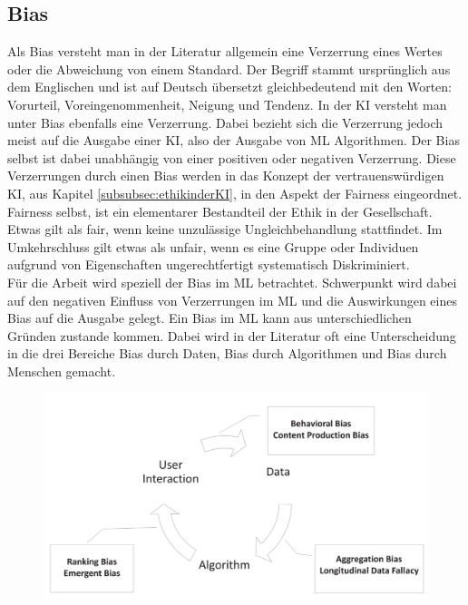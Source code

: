 \begin{onehalfspace}
    \subsection{Bias}
    \label{subsubsec:Bias}
        Als Bias versteht man in der Literatur allgemein eine Verzerrung eines Wertes oder die Abweichung von einem Standard.\cite{Fabi2022} Der Begriff stammt ursprünglich aus dem Englischen und ist auf Deutsch übersetzt gleichbedeutend mit den Worten: Vorurteil, Voreingenommenheit, Neigung und Tendenz. In der \ac*{KI} versteht man unter Bias ebenfalls eine Verzerrung. Dabei bezieht sich die Verzerrung jedoch meist auf die Ausgabe einer \ac*{KI}, also der Ausgabe von \ac*{ML} Algorithmen.\cite{Dilmegani2020} Der Bias selbst ist dabei unabhängig von einer positiven oder negativen Verzerrung.\cite{silberg2019notes}\cite{ntoutsi2020bias}
        Diese Verzerrungen durch einen Bias werden in das Konzept der vertrauenswürdigen \ac*{KI}, aus Kapitel \ref{subsubsec:ethikinderKI}, in den Aspekt der Fairness eingeordnet. Fairness selbst, ist ein elementarer Bestandteil der Ethik in der Gesellschaft. Etwas gilt als \glqq{}fair\grqq{}, wenn keine unzulässige Ungleichbehandlung stattfindet. Im Umkehrschluss gilt etwas als \glqq{}unfair\grqq{}, wenn es eine Gruppe oder Individuen aufgrund von Eigenschaften ungerechtfertigt systematisch Diskriminiert.\cite{silberg2019notes}
        \\
        Für die Arbeit wird speziell der Bias im \ac*{ML} betrachtet. Schwerpunkt wird dabei auf den negativen Einfluss von Verzerrungen im \ac*{ML} und die Auswirkungen eines Bias auf die Ausgabe gelegt. Ein Bias im \ac*{ML} kann aus unterschiedlichen Gründen zustande kommen. Dabei wird in der Literatur oft eine Unterscheidung in die drei Bereiche Bias durch Daten, Bias durch Algorithmen und Bias durch Menschen gemacht.\cite{srinivasan2021biases}\cite{Mehrabi2021}
        \begin{figure}[h]
            \centering
            \includegraphics[width =15cm]{Bilder/Bias_cyrcle.png}

\end{figure}
\end{onehalfspace}
